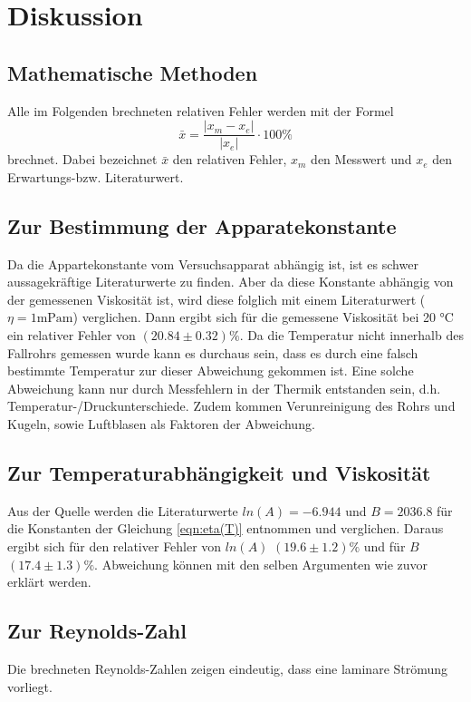 \section{Diskussion}
\label{sec:Diskussion}
\subsection{Mathematische Methoden}
Alle im Folgenden brechneten relativen Fehler werden mit der Formel
\begin{equation*}
  \bar{x} = \frac{\lvert x_m - x_e \rvert}{\lvert x_e \rvert} \cdot 100 \%
\end{equation*}
brechnet. Dabei bezeichnet $\bar{x}$ den relativen Fehler, $ x_m $ den Messwert
und $x_e$ den Erwartungs-bzw. Literaturwert.
\subsection{Zur Bestimmung der Apparatekonstante}
Da die Appartekonstante vom Versuchsapparat abhängig ist, ist es schwer
aussagekräftige Literaturwerte zu finden. Aber da diese Konstante abhängig
von der gemessenen Viskosität ist, wird diese folglich mit einem Literaturwert
($\eta = 1 \si{\milli\pascal\meter}$)
\cite{wiki2} verglichen. Dann ergibt sich für die gemessene Viskosität bei
 20 \si{\celsius} ein relativer Fehler von $(20.84 \pm 0.32)\si{\percent}$.
Da die Temperatur nicht innerhalb des Fallrohrs gemessen wurde kann es durchaus
sein, dass es durch eine falsch bestimmte Temperatur zur dieser Abweichung
gekommen ist. Eine solche Abweichung kann nur durch Messfehlern in der Thermik
entstanden sein, d.h. Temperatur-/Druckunterschiede. Zudem kommen Verunreinigung
des Rohrs und Kugeln, sowie Luftblasen als Faktoren der Abweichung.
\subsection{Zur Temperaturabhängigkeit und Viskosität}
Aus der Quelle \cite{wiki3} werden die Literaturwerte $ ln(A) = -6.944 $ und
$B =2036.8$ für die Konstanten der Gleichung \eqref{eqn:eta(T)} entnommen und
verglichen. Daraus ergibt sich für den relativer Fehler von $ln(A)$  $(19.6 \pm 1.2)
\si{\percent}$ und für $B$ $(17.4 \pm 1.3) \si{\percent}$. Abweichung können mit
den selben Argumenten wie zuvor erklärt werden.
\subsection{Zur Reynolds-Zahl}
Die brechneten Reynolds-Zahlen zeigen eindeutig, dass eine laminare Strömung
vorliegt.

